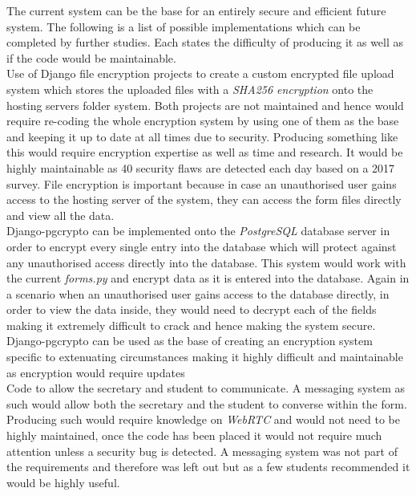 \documentclass[../main.tex]{subfiles}
\begin{document}
\raggedright
The current system can be the base for an entirely secure and efficient future system. The following is a list of possible implementations which can be completed by further studies. Each states the difficulty of producing it as well as if the code would be maintainable. \\[4mm]

Use of Django file encryption projects\cite{ruddra}\cite{danielquinn} to create a custom encrypted file upload system which stores the uploaded files with a \textit{SHA256 encryption} onto the hosting servers folder system. Both projects are not maintained and hence would require re-coding the whole encryption system by using one of them as the base and keeping it up to date at all times due to security. Producing something like this would require encryption expertise as well as time and research. It would be highly maintainable as 40 security flaws are detected each day based on a 2017 survey\cite{vulner}. File encryption is important because in case an unauthorised user gains access to the hosting server of the system, they can access the form files directly and view all the data. \\[4mm]
  
Django-pgcrypto\cite{dbencrypt} can be implemented onto the \textit{PostgreSQL} database server in order to encrypt every single entry into the database which will protect against any unauthorised access directly into the database. This system would work with the current \textit{forms.py} and encrypt data as it is entered into the database. Again in a scenario when an unauthorised user gains access to the database directly, in order to view the data inside, they would need to decrypt each of the fields making it extremely difficult to crack and hence making the system secure. Django-pgcrypto\cite{dbencrypt} can be used as the base of creating an encryption system specific to extenuating circumstances making it highly difficult and maintainable as encryption would require updates \\[4mm]
  
Code to allow the secretary and student to communicate. A messaging system as such would allow both the secretary and the student to converse within the form. Producing such would require knowledge on \textit{WebRTC} and would not need to be highly maintained, once the code has been placed it would not require much attention unless a security bug is detected. A messaging system was not part of the requirements and therefore was left out but as a few students recommended it would be highly useful. \\[4mm]
  
\end{document}
